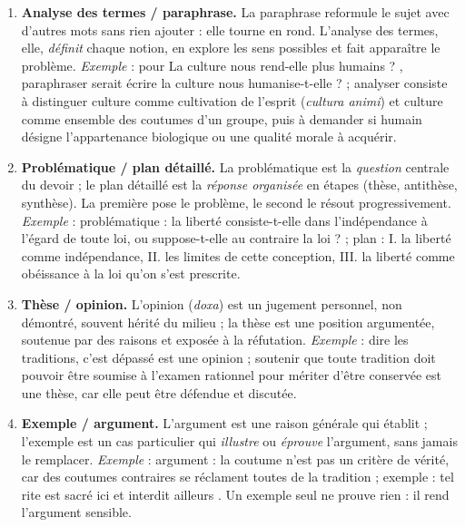 \documentclass[11pt]{article}
\begin{document}
\begin{corrige}
\begin{enumerate}
\item \textbf{Analyse des termes / paraphrase.} La paraphrase reformule le sujet avec d'autres mots sans rien ajouter : elle tourne en rond. L'analyse des termes, elle, \emph{définit} chaque notion, en explore les sens possibles et fait apparaître le problème. \emph{Exemple} : pour \guillemotleft La culture nous rend-elle plus humains ? \guillemotright, paraphraser serait écrire \guillemotleft la culture nous humanise-t-elle ? \guillemotright ; analyser consiste à distinguer culture comme cultivation de l'esprit (\emph{cultura animi}) et culture comme ensemble des coutumes d'un groupe, puis à demander si \guillemotleft humain \guillemotright désigne l'appartenance biologique ou une qualité morale à acquérir.
\item \textbf{Problématique / plan détaillé.} La problématique est la \emph{question} centrale du devoir ; le plan détaillé est la \emph{réponse organisée} en étapes (thèse, antithèse, synthèse). La première pose le problème, le second le résout progressivement. \emph{Exemple} : problématique : \guillemotleft la liberté consiste-t-elle dans l'indépendance à l'égard de toute loi, ou suppose-t-elle au contraire la loi ? \guillemotright ; plan : I. la liberté comme indépendance, II. les limites de cette conception, III. la liberté comme obéissance à la loi qu'on s'est prescrite.
\item \textbf{Thèse / opinion.} L'opinion (\emph{doxa}) est un jugement personnel, non démontré, souvent hérité du milieu ; la thèse est une position argumentée, soutenue par des raisons et exposée à la réfutation. \emph{Exemple} : dire \guillemotleft les traditions, c'est dépassé \guillemotright est une opinion ; soutenir que \guillemotleft toute tradition doit pouvoir être soumise à l'examen rationnel pour mériter d'être conservée \guillemotright est une thèse, car elle peut être défendue et discutée.
\item \textbf{Exemple / argument.} L'argument est une raison générale qui établit ; l'exemple est un cas particulier qui \emph{illustre} ou \emph{éprouve} l'argument, sans jamais le remplacer. \emph{Exemple} : argument : \guillemotleft la coutume n'est pas un critère de vérité, car des coutumes contraires se réclament toutes de la tradition \guillemotright ; exemple : \guillemotleft tel rite est sacré ici et interdit ailleurs \guillemotright. Un exemple seul ne prouve rien : il rend l'argument sensible.
\end{enumerate}
\end{corrige}
\end{document}
